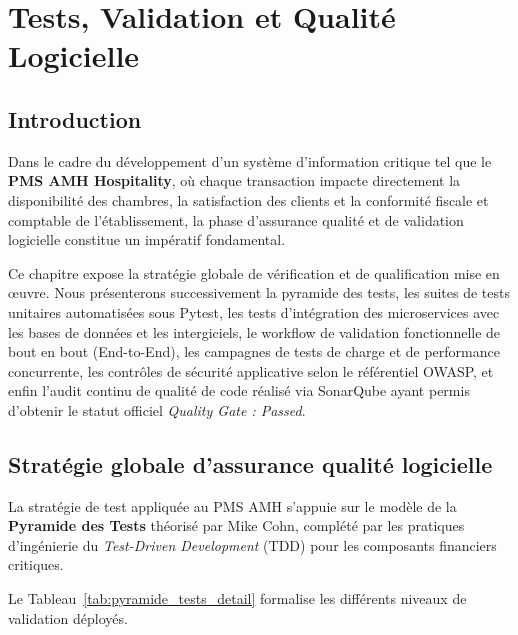 \chapter{Tests, Validation et Qualité Logicielle}
\label{chap:tests}

\section{Introduction}

Dans le cadre du développement d'un système d'information critique tel que le \textbf{PMS AMH Hospitality}, où chaque transaction impacte directement la disponibilité des chambres, la satisfaction des clients et la conformité fiscale et comptable de l'établissement, la phase d'assurance qualité et de validation logicielle constitue un impératif fondamental.

Ce chapitre expose la stratégie globale de vérification et de qualification mise en œuvre. Nous présenterons successivement la pyramide des tests, les suites de tests unitaires automatisées sous Pytest, les tests d'intégration des microservices avec les bases de données et les intergiciels, le workflow de validation fonctionnelle de bout en bout (End-to-End), les campagnes de tests de charge et de performance concurrente, les contrôles de sécurité applicative selon le référentiel OWASP, et enfin l'audit continu de qualité de code réalisé via SonarQube ayant permis d'obtenir le statut officiel \textit{Quality Gate : Passed}.

\section{Stratégie globale d'assurance qualité logicielle}

La stratégie de test appliquée au PMS AMH s'appuie sur le modèle de la \textbf{Pyramide des Tests} théorisé par Mike Cohn, complété par les pratiques d'ingénierie du \textit{Test-Driven Development} (TDD) pour les composants financiers critiques.

Le Tableau~\ref{tab:pyramide_tests_detail} formalise les différents niveaux de validation déployés.

